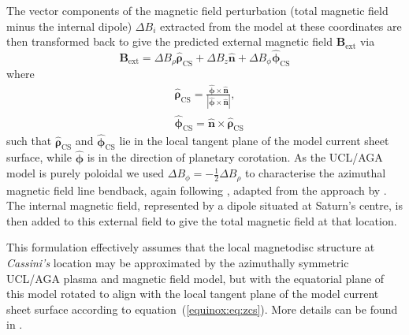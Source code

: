 The vector components of the magnetic field perturbation (total magnetic field minus the internal dipole) $\Delta B_i$ extracted from the model at these coordinates are then transformed back to give the predicted external magnetic field $\boldsymbol{B_\mathrm{ext}}$ via
\begin{equation}\label{equinox:eq:Bext}
\boldsymbol{B_\mathrm{ext}} = \Delta B_\rho \hat{\boldsymbol{\rho}}_\mathrm{CS} + \Delta B_z \hat{\boldsymbol{n}} + \Delta B_\phi \hat{\boldsymbol{\phi}}_\mathrm{CS}
\end{equation}
where
\begin{align}\label{equinox:eq:vectortransform}
& \hat{\boldsymbol{\rho}}_\mathrm{CS} = \frac{\hat{\boldsymbol{\phi}} \times \hat{\boldsymbol{n}}}{| \hat{\boldsymbol{\phi}} \times \hat{\boldsymbol{n}}|}, \nonumber\\
& \hat{\boldsymbol{\phi}}_\mathrm{CS} = \hat{\boldsymbol{n}} \times \hat{\boldsymbol{\rho}}_\mathrm{CS}
\end{align}
such that $\hat{\boldsymbol{\rho}}_\mathrm{CS}$ and $\hat{\boldsymbol{\phi}}_\mathrm{CS}$ lie in the local tangent plane of the model current sheet surface, while $\hat{\boldsymbol{\phi}}$ is in the direction of planetary corotation. As the UCL/AGA model is purely poloidal we used $\Delta B_\phi = -\frac{1}{2} \Delta B_\rho$ to characterise the azimuthal magnetic field line bendback, again following \citet{achilleos2014}, adapted from the approach by \citet{arridge2011}. The internal magnetic field, represented by a dipole situated at Saturn's centre, is then added to this external field to give the total magnetic field at that location. 

This formulation effectively assumes that the local magnetodisc structure at \textit{Cassini's} location may be approximated by the azimuthally symmetric UCL/AGA plasma and magnetic field model, but with the equatorial plane of this model rotated to align with the local tangent plane of the model current sheet surface according to equation~(\ref{equinox:eq:zcs}). More details can be found in {\citet{achilleos2014}}.

